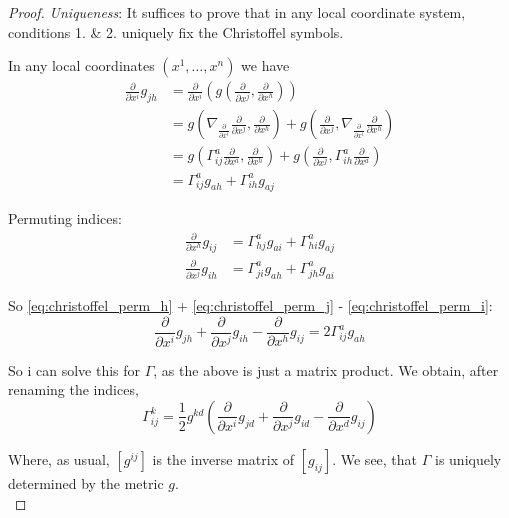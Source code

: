 \begin{proof}


\textit{Uniqueness}: It suffices to prove that in any local coordinate system, conditions 1. \& 2. uniquely fix the Christoffel symbols.

In any local coordinates $(x^1, \ldots, x^n)$ we have
\begin{align}
\frac{\partial}{\partial x^i} g_{jh} &= \frac{\partial}{\partial x^i}\left(g\left(\frac{\partial}{\partial x^j}, \frac{\partial}{\partial x^h}\right)\right) \nonumber \\
&= g\left(\nabla_{\frac{\partial}{\partial x^i}} \frac{\partial}{\partial x^j}, \frac{\partial}{\partial x^h}\right) + g\left(\frac{\partial}{\partial x^j}, \nabla_{\frac{\partial}{\partial x^i}} \frac{\partial}{\partial x^h}\right) \nonumber \\
&= g\left(\Gamma_{ij}^a \frac{\partial}{\partial x^a}, \frac{\partial}{\partial x^h}\right) + g\left(\frac{\partial}{\partial x^j}, \Gamma_{ih}^a \frac{\partial}{\partial x^a}\right) \nonumber \\
& = \Gamma_{ij}^a g_{ah} + \Gamma_{ih}^a g_{aj} \label{eq:christoffel_perm_i}
\end{align}

Permuting indices:
\begin{align}
\frac{\partial}{\partial x^h} g_{ij} &= \Gamma_{hj}^a g_{ai} + \Gamma_{hi}^a g_{aj} \label{eq:christoffel_perm_h} \\
\frac{\partial}{\partial x^j} g_{ih} &= \Gamma_{ji}^a g_{ah} + \Gamma_{jh}^a g_{ai} \label{eq:christoffel_perm_j}
\end{align}

So \eqref{eq:christoffel_perm_h} + \eqref{eq:christoffel_perm_j} - \eqref{eq:christoffel_perm_i}:
\[
\frac{\partial}{\partial x^i} g_{jh} + \frac{\partial}{\partial x^j} g_{ih} - \frac{\partial}{\partial x^h} g_{ij} = 2 \Gamma_{ij}^a g_{ah}
\]

So i can solve this for $\Gamma$, as the above is just a matrix product. We obtain, after renaming the indices,
\begin{equation}
    \label{eq:christoffel_levi_civita}
    \Gamma_{ij}^k = \frac{1}{2} g^{kd} \left( \frac{\partial}{\partial x^i} g_{jd} + \frac{\partial}{\partial x^j} g_{id} - \frac{\partial}{\partial x^d} g_{ij} \right)
\end{equation}

Where, as usual, $[g^{ij}]$ is the inverse matrix of $[g_{ij}]$. We see, that $\Gamma$ is uniquely determined by the metric $g$.\\


\end{proof}
